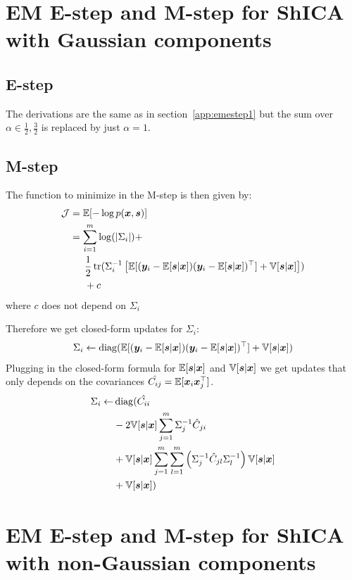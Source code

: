 \section{EM E-step and M-step for ShICA with Gaussian components}
  \subsection{E-step}
  \label{conditional_density}
  The derivations are the same as in section~\ref{app:emestep1} but the sum over
  $\alpha \in {\frac12, \frac32}$ is replaced by just $\alpha=1$.


\subsection{M-step}
The function to minimize in the M-step is then given by:
\begin{align}
  \mathcal{J} &= \mathbb{E}[-\log p(\boldsymbol{x}, \boldsymbol{s})] \\
        &= \sum_{i=1}^m \log(|\Sigma_i|) + \\ &\enspace \enspace \enspace \frac12 \mathop{\mathrm{tr}}(\Sigma_i^{-1} \left[\mathbb{E}[(\boldsymbol{y}_i - \mathbb{E}[\boldsymbol{s} | \boldsymbol{x}]) (\boldsymbol{y}_i - \mathbb{E}[\boldsymbol{s} | \boldsymbol{x}])^{\top}]+ \mathbb{V}[\boldsymbol{s} | \boldsymbol{x}]\right]) \\ &\enspace \enspace \enspace + c
\end{align}
where $c$ does not depend on $\Sigma_i$

Therefore we get closed-form updates for $\Sigma_i$: 
\begin{align}
\Sigma_i \leftarrow  \operatorname*{diag}(\mathbb{E}[(\boldsymbol{y}_i - \mathbb{E}[\boldsymbol{s} | \boldsymbol{x}]) (\boldsymbol{y}_i - \mathbb{E}[\boldsymbol{s} | \boldsymbol{x}])^{\top}]+ \mathbb{V}[\boldsymbol{s} | \boldsymbol{x}])
\end{align}
Plugging in the closed-form formula for $\mathbb{E}[\boldsymbol{s}|\boldsymbol{x}]$ and $\mathbb{V}[\boldsymbol{s}|\boldsymbol{x}]$ we get updates that only depends on the covariances $\hat{C_{ij}} = \mathbb{E}[\boldsymbol{x}_i \boldsymbol{x}_j^{\top}]$.
\begin{align*}
\Sigma_i \leftarrow &\operatorname*{diag}(\hat{C_{ii}} \\&- 2 \mathbb{V}[\boldsymbol{s} | \boldsymbol{x}]  \sum_{j=1}^m \Sigma_j^{-1} \hat{C}_{ji}  \\&+ \mathbb{V}[\boldsymbol{s} | \boldsymbol{x}]  \sum_{j = 1}^m \sum_{l = 1}^m \left(\Sigma_j^{-1} \hat{C}_{jl} \Sigma_l^{-1} \right) \mathbb{V}[\boldsymbol{s} | \boldsymbol{x}] \\&+ \mathbb{V}[\boldsymbol{s} | \boldsymbol{x}])
\end{align*}


\section{EM E-step and M-step for ShICA with non-Gaussian components}
\label{app:emestep}

